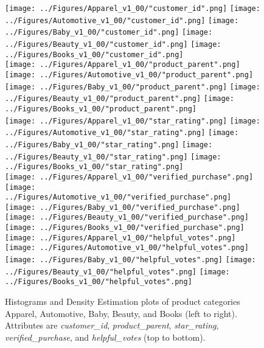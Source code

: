 \documentclass[10pt, conference, compsocconf]{IEEEtran}
\begin{document}
\begin{figure*}[ht]
	\vspace{-2mm}
	\centering
	\texttt{[image: ../Figures/Apparel\_v1\_00/"customer\_id".png]}
	\texttt{[image: ../Figures/Automotive\_v1\_00/"customer\_id".png]}
	\texttt{[image: ../Figures/Baby\_v1\_00/"customer\_id".png]}
	\texttt{[image: ../Figures/Beauty\_v1\_00/"customer\_id".png]}
	\texttt{[image: ../Figures/Books\_v1\_00/"customer\_id".png]}\\
	
	\centering
	\texttt{[image: ../Figures/Apparel\_v1\_00/"product\_parent".png]}
	\texttt{[image: ../Figures/Automotive\_v1\_00/"product\_parent".png]}
	\texttt{[image: ../Figures/Baby\_v1\_00/"product\_parent".png]}
	\texttt{[image: ../Figures/Beauty\_v1\_00/"product\_parent".png]}
	\texttt{[image: ../Figures/Books\_v1\_00/"product\_parent".png]}\\
	
	\centering
	\texttt{[image: ../Figures/Apparel\_v1\_00/"star\_rating".png]}
	\texttt{[image: ../Figures/Automotive\_v1\_00/"star\_rating".png]}
	\texttt{[image: ../Figures/Baby\_v1\_00/"star\_rating".png]}
	\texttt{[image: ../Figures/Beauty\_v1\_00/"star\_rating".png]}
	\texttt{[image: ../Figures/Books\_v1\_00/"star\_rating".png]}\\
	
	\centering
	\texttt{[image: ../Figures/Apparel\_v1\_00/"verified\_purchase".png]}
	\texttt{[image: ../Figures/Automotive\_v1\_00/"verified\_purchase".png]}
	\texttt{[image: ../Figures/Baby\_v1\_00/"verified\_purchase".png]}
	\texttt{[image: ../Figures/Beauty\_v1\_00/"verified\_purchase".png]}
	\texttt{[image: ../Figures/Books\_v1\_00/"verified\_purchase".png]}\\
	
	\centering
	\texttt{[image: ../Figures/Apparel\_v1\_00/"helpful\_votes".png]}
	\texttt{[image: ../Figures/Automotive\_v1\_00/"helpful\_votes".png]}
	\texttt{[image: ../Figures/Baby\_v1\_00/"helpful\_votes".png]}
	\texttt{[image: ../Figures/Beauty\_v1\_00/"helpful\_votes".png]}
	\texttt{[image: ../Figures/Books\_v1\_00/"helpful\_votes".png]}\\
	
	\caption{Histograms and Density Estimation plots of product categories Apparel, Automotive, Baby, Beauty, and Books (left to right). Attributes are \textit{customer\_id}, \textit{product\_parent}, \textit{star\_rating}, \textit{verified\_purchase}, and \textit{helpful\_votes} (top to bottom).}
	\label{fig1}
\end{figure*}
\end{document}
